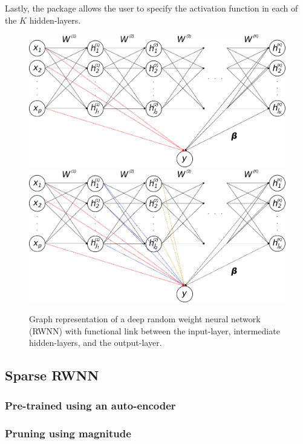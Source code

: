 \documentclass[
]{jss}
\begin{document}
Lastly, the  package allows the user to specify the activation
function in each of the \(K\) hidden-layers.

\begin{CodeChunk}
\begin{figure}[ht!]

{\centering \includegraphics[width=0.45\linewidth]{./Figures/deepRWNN} \includegraphics[width=0.45\linewidth]{./Figures/deepRWNNalt} 

}

\caption[Graph representation of a deep random weight neural network (RWNN) with functional link between the input-layer, intermediate hidden-layers, and the output-layer]{Graph representation of a deep random weight neural network (RWNN) with functional link between the input-layer, intermediate hidden-layers, and the output-layer.}\label{fig:deeprwnn}
\end{figure}
\end{CodeChunk}

\hypertarget{sparse-rwnn}{%
\subsection{Sparse RWNN}\label{sparse-rwnn}}

\hypertarget{pre-trained-using-an-auto-encoder}{%
\subsubsection{Pre-trained using an
auto-encoder}\label{pre-trained-using-an-auto-encoder}}

\hypertarget{pruning-using-magnitude}{%
\subsubsection{Pruning using magnitude}\label{pruning-using-magnitude}}
\end{document}
